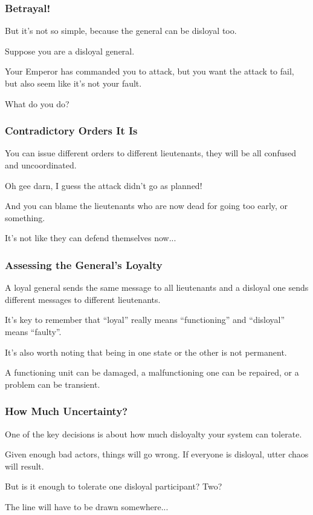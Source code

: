 \begin{frame}
	\frametitle{Betrayal!}

	But it's not so simple, because the general can be disloyal too.

	Suppose you are a disloyal general.

	Your Emperor has commanded you to attack, but you want the attack to fail, but also seem like it's not your fault.

	What do you do?

\end{frame}

\begin{frame}
	\frametitle{Contradictory Orders It Is}

	You can issue different orders to different lieutenants, they will be all confused and uncoordinated.

	Oh gee darn, I guess the attack didn't go as planned!

	And you can blame the lieutenants who are now dead for going too early, or something.

	It's not like they can defend themselves now...

\end{frame}

\begin{frame}
	\frametitle{Assessing the General's Loyalty}

	A loyal general sends the same message to all lieutenants and a disloyal one sends different messages to different lieutenants.

	It's key to remember that ``loyal'' really means ``functioning'' and ``disloyal'' means ``faulty''.

	It's also worth noting that being in one state or the other is not permanent.

	A functioning unit can be damaged, a malfunctioning one can be repaired, or a problem can be transient.

\end{frame}

\begin{frame}
	\frametitle{How Much Uncertainty?}

	One of the key decisions is about how much disloyalty your system can tolerate.

	Given enough bad actors, things will go wrong. If everyone is disloyal, utter chaos will result.

	But is it enough to tolerate one disloyal participant? Two?

	The line will have to be drawn somewhere...

\end{frame}

